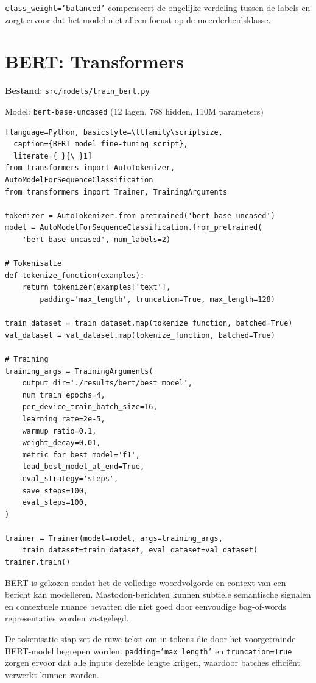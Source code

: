 \texttt{class\_weight='balanced'} compenseert de ongelijke verdeling tussen de
labels en zorgt ervoor dat het model niet alleen focust op de meerderheidsklasse.

\section{BERT: Transformers}

\textbf{Bestand}: \texttt{src/models/train\_bert.py}

Model: \texttt{bert-base-uncased} (12 lagen, 768 hidden, 110M parameters)

\begin{lstlisting}[language=Python, basicstyle=\ttfamily\scriptsize,
  caption={BERT model fine-tuning script},
  literate={_}{\_}1]
from transformers import AutoTokenizer, AutoModelForSequenceClassification
from transformers import Trainer, TrainingArguments

tokenizer = AutoTokenizer.from_pretrained('bert-base-uncased')
model = AutoModelForSequenceClassification.from_pretrained(
    'bert-base-uncased', num_labels=2)

# Tokenisatie
def tokenize_function(examples):
    return tokenizer(examples['text'],
        padding='max_length', truncation=True, max_length=128)

train_dataset = train_dataset.map(tokenize_function, batched=True)
val_dataset = val_dataset.map(tokenize_function, batched=True)

# Training
training_args = TrainingArguments(
    output_dir='./results/bert/best_model',
    num_train_epochs=4,
    per_device_train_batch_size=16,
    learning_rate=2e-5,
    warmup_ratio=0.1,
    weight_decay=0.01,
    metric_for_best_model='f1',
    load_best_model_at_end=True,
    eval_strategy='steps',
    save_steps=100,
    eval_steps=100,
)

trainer = Trainer(model=model, args=training_args,
    train_dataset=train_dataset, eval_dataset=val_dataset)
trainer.train()
\end{lstlisting}

BERT is gekozen omdat het de volledige woordvolgorde en context van een bericht
kan modelleren. Mastodon-berichten kunnen subtiele semantische signalen en
contextuele nuance bevatten die niet goed door eenvoudige bag-of-words
representaties worden vastgelegd.

De tokenisatie stap zet de ruwe tekst om in tokens die door het voorgetrainde
BERT-model begrepen worden. \texttt{padding='max\_length'} en
\texttt{truncation=True} zorgen ervoor dat alle inputs dezelfde lengte krijgen,
waardoor batches efficiënt verwerkt kunnen worden.

